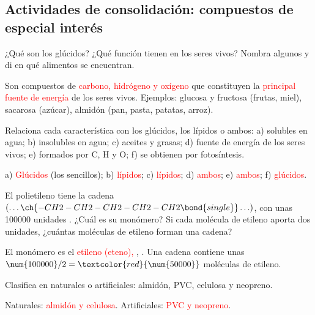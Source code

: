 \subsection*{Actividades de consolidación: compuestos de especial interés}

\begin{exercise}
    ¿Qué son los glúcidos? ¿Qué función tienen en los seres vivos? Nombra algunos y di en qué alimentos se encuentran.
    \begin{solu}
        Son compuestos de \textcolor{red}{carbono, hidrógeno y oxígeno} que constituyen la \textcolor{red}{principal fuente de energía} de los seres vivos. Ejemplos: glucosa y fructosa (frutas, miel), sacarosa (azúcar), almidón (pan, pasta, patatas, arroz).
    \end{solu}
\end{exercise}

\begin{exercise}
    Relaciona cada característica con los glúcidos, los lípidos o ambos: a) solubles en agua; b) insolubles en agua; c) aceites y grasas; d) fuente de energía de los seres vivos; e) formados por C, H y O; f) se obtienen por fotosíntesis.
    \begin{solu}
        a) \textcolor{red}{Glúcidos} (los sencillos); b) \textcolor{red}{lípidos}; c) \textcolor{red}{lípidos}; d) \textcolor{red}{ambos}; e) \textcolor{red}{ambos}; f) \textcolor{red}{glúcidos}.
    \end{solu}
\end{exercise}

\begin{exercise}
    El polietileno tiene la cadena \((\ldots\ch{-CH2-CH2-CH2-CH2-CH2\bond{single}}\ldots)\), con unas \num{100000} unidades . ¿Cuál es su monómero? Si cada molécula de etileno aporta dos unidades, ¿cuántas moléculas de etileno forman una cadena?
    \begin{solu}
        El monómero es el \textcolor{red}{etileno (eteno), }, . Una cadena contiene unas \(\num{100000}/2 = \textcolor{red}{\num{50000}}\) moléculas de etileno.
    \end{solu}
\end{exercise}

\begin{exercise}
    Clasifica en naturales o artificiales: almidón, PVC, celulosa y neopreno.
    \begin{solu}
        Naturales: \textcolor{red}{almidón y celulosa}. Artificiales: \textcolor{red}{PVC y neopreno}.
    \end{solu}
\end{exercise}
